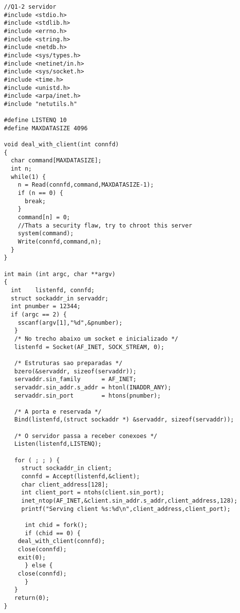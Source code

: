 \documentclass[11pt]{article}
\begin{document}
\begin{lstlisting}
//Q1-2 servidor
#include <stdio.h>
#include <stdlib.h>
#include <errno.h>
#include <string.h>
#include <netdb.h>
#include <sys/types.h>
#include <netinet/in.h>
#include <sys/socket.h>
#include <time.h>
#include <unistd.h>
#include <arpa/inet.h>
#include "netutils.h"

#define LISTENQ 10
#define MAXDATASIZE 4096

void deal_with_client(int connfd)
{
  char command[MAXDATASIZE];
  int n;
  while(1) {
    n = Read(connfd,command,MAXDATASIZE-1);
    if (n == 0) {
      break;
    }
    command[n] = 0;
    //Thats a security flaw, try to chroot this server
    system(command);
    Write(connfd,command,n);
  }
}

int main (int argc, char **argv)
{
  int    listenfd, connfd;
  struct sockaddr_in servaddr;
  int pnumber = 12344;
  if (argc == 2) {
    sscanf(argv[1],"%d",&pnumber);
   }
   /* No trecho abaixo um socket e inicializado */
   listenfd = Socket(AF_INET, SOCK_STREAM, 0);

   /* Estruturas sao preparadas */
   bzero(&servaddr, sizeof(servaddr));
   servaddr.sin_family      = AF_INET;
   servaddr.sin_addr.s_addr = htonl(INADDR_ANY);
   servaddr.sin_port        = htons(pnumber);   

   /* A porta e reservada */
   Bind(listenfd,(struct sockaddr *) &servaddr, sizeof(servaddr));

   /* O servidor passa a receber conexoes */
   Listen(listenfd,LISTENQ);

   for ( ; ; ) {
     struct sockaddr_in client;
     connfd = Accept(listenfd,&client);     
     char client_address[128];
     int client_port = ntohs(client.sin_port);
     inet_ntop(AF_INET,&client.sin_addr.s_addr,client_address,128);
     printf("Serving client %s:%d\n",client_address,client_port);

      int chid = fork();
      if (chid == 0) {
	deal_with_client(connfd);
	close(connfd);
	exit(0);
      } else {
	close(connfd);
      }
   }
   return(0);
}

\end{lstlisting}
\end{document}
